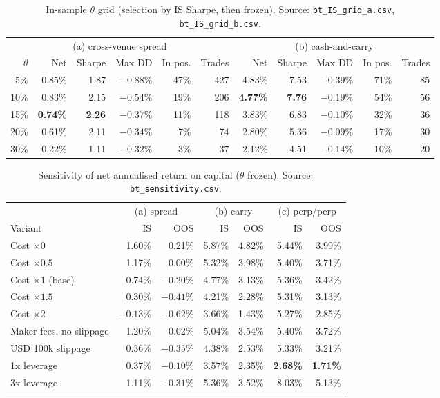 \documentclass[11pt,a4paper]{article}
\begin{document}
\begin{table}[H]
\centering\small
\caption{In-sample $\theta$ grid (selection by IS Sharpe, then frozen). Source: \texttt{bt\_IS\_grid\_a.csv}, \texttt{bt\_IS\_grid\_b.csv}.}
\label{tab:grid}
\footnotesize\setlength{\tabcolsep}{4pt}
\begin{tabular}{rrrrrr@{\hspace{18pt}}rrrrr}
\toprule
\multicolumn{6}{c}{(a) cross-venue spread} & \multicolumn{5}{c}{(b) cash-and-carry}\\
\cmidrule(lr){1-6}\cmidrule(lr){7-11}
$\theta$ & Net & Sharpe & Max DD & In pos. & Trades & Net & Sharpe & Max DD & In pos. & Trades\\
\midrule
5\%  & 0.85\% & 1.87 & $-0.88\%$ & 47\% & 427 & 4.83\% & 7.53 & $-0.39\%$ & 71\% & 85\\
10\% & 0.83\% & 2.15 & $-0.54\%$ & 19\% & 206 & \textbf{4.77\%} & \textbf{7.76} & $-0.19\%$ & 54\% & 56\\
15\% & \textbf{0.74\%} & \textbf{2.26} & $-0.37\%$ & 11\% & 118 & 3.83\% & 6.83 & $-0.10\%$ & 32\% & 36\\
20\% & 0.61\% & 2.11 & $-0.34\%$ & 7\% & 74 & 2.80\% & 5.36 & $-0.09\%$ & 17\% & 30\\
30\% & 0.22\% & 1.11 & $-0.32\%$ & 3\% & 37 & 2.12\% & 4.51 & $-0.14\%$ & 10\% & 20\\
\bottomrule
\end{tabular}
\end{table}

\begin{table}[H]
\centering\small
\caption{Sensitivity of net annualised return on capital ($\theta$ frozen). Source: \texttt{bt\_sensitivity.csv}.}
\label{tab:sens}
\begin{tabular}{lrrrrrr}
\toprule
 & \multicolumn{2}{c}{(a) spread} & \multicolumn{2}{c}{(b) carry} & \multicolumn{2}{c}{(c) perp/perp}\\
\cmidrule(lr){2-3}\cmidrule(lr){4-5}\cmidrule(lr){6-7}
Variant & IS & OOS & IS & OOS & IS & OOS\\
\midrule
Cost $\times 0$   & 1.60\% & 0.21\% & 5.87\% & 4.82\% & 5.44\% & 3.99\%\\
Cost $\times 0.5$ & 1.17\% & 0.00\% & 5.32\% & 3.98\% & 5.40\% & 3.71\%\\
Cost $\times 1$ (base) & 0.74\% & $-0.20\%$ & 4.77\% & 3.13\% & 5.36\% & 3.42\%\\
Cost $\times 1.5$ & 0.30\% & $-0.41\%$ & 4.21\% & 2.28\% & 5.31\% & 3.13\%\\
Cost $\times 2$   & $-0.13\%$ & $-0.62\%$ & 3.66\% & 1.43\% & 5.27\% & 2.85\%\\
Maker fees, no slippage & 1.20\% & 0.02\% & 5.04\% & 3.54\% & 5.40\% & 3.72\%\\
USD 100k slippage & 0.36\% & $-0.35\%$ & 4.38\% & 2.53\% & 5.33\% & 3.21\%\\
1x leverage & 0.37\% & $-0.10\%$ & 3.57\% & 2.35\% & \textbf{2.68\%} & \textbf{1.71\%}\\
3x leverage & 1.11\% & $-0.31\%$ & 5.36\% & 3.52\% & 8.03\% & 5.13\%\\
\bottomrule
\end{tabular}
\end{table}
\end{document}
